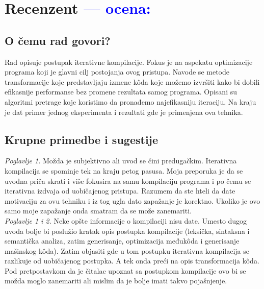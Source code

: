 \documentclass[a4paper]{report}
\newcommand{\odgovor}[1]{\textcolor{blue}{#1}}
\begin{document}
\chapter{Recenzent \odgovor{--- ocena:} }


\section{O čemu rad govori?}
Rad opisuje postupak iterativne kompilacije. Fokus je na aspekatu optimizacije programa koji je glavni cilj postojanja ovog pristupa. Navode se metode transformacije koje predstavljaju izmene kôda koje možemo izvršiti kako bi dobili efikasnije performanse bez promene rezultata samog programa. Opisani su algoritmi pretrage koje koristimo da pronađemo najefikasniju iteraciju. Na kraju je dat primer jednog eksperimenta i rezultati gde je primenjena ova tehnika.

\section{Krupne primedbe i sugestije}

\textit{Poglavlje 1.} Možda je subjektivno ali uvod se čini predugačkim. Iterativna kompilacija se spominje tek na kraju petog pasusa. Moja preporuka je da se uvodna priča skrati i više fokusira na samu kompilaciju programa i po čemu se iterativna izdvaja od uobičajenog pristupa. Razumem da ste hteli da date motivaciju za ovu tehniku i iz tog ugla dato zapažanje je korektno. Ukoliko je ovo samo moje zapažanje onda smatram da se može zanemariti. \\

\textit{Poglavlje 1 i 2.} Neke opšte informacije o kompilaciji nisu date. Umesto dugog uvoda bolje bi poslužio kratak opis postupka kompilacije (leksička, sintaksna i semantička analiza, zatim generisanje, optimizacija međukôda i generisanje mašinskog kôda). Zatim objasiti gde u tom postupku iterativna kompilacija se razlikuje od uobičajenog postupka. A tek onda preći na opis transformacija kôda. Pod pretpostavkom da je čitalac upoznat sa postupkom kompilacije ovo bi se možda moglo zanemariti ali mislim da je bolje imati takvo pojašnjenje. \\
\end{document}
